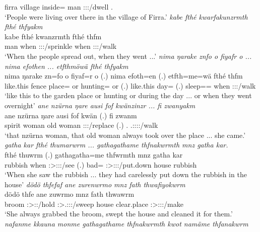 \begin{exe}
	firra village inside={\Loc} man \Stpl:\Sbj:\Pst:\Dur/dwell \Dist.{\All}\\
	\trans `People were living over there in the village of Firra.'
	\emph{kabe fthé kwarfakunzrmth fthé thfyakm}\\
	\gll kabe fthé kwanzrmth fthé thfm\\
	man when \Stpl:\Sbj:\Pst:\Dur/sprinkle when \Stpl:\Sbj:\Pst:\Dur/walk\\
	\trans `When the people spread out, when they went ...'
	\emph{nima ŋarake znfo o fiyafr o ... nima efothen ... etfthmöwä fthé thfyakm}\\
	\gll nima ŋarake zn=fo o fiyaf=r o (.) nima efoth=en (.) etfth=me=wä fthé thfm\\
	{like.this} fence place={\Loc} or hunting={\Purp} or (.) {like.this} day={\Loc} (.) sleep=\Ins={\Emph} when \Stpl:\Sbj:\Pst:\Dur/walk\\
	\trans `like this to the garden place or hunting or during the day ... or when they went overnight'
	\emph{ane nzürna ŋare ausi fof kwänzinzr ... fi zwanyakm}\\
	\gll ane nzürna ŋare ausi fof kwän (.) fi zwanm\\
	{\Dem} spirit woman {old woman} {\Emph} \Stsg:\Sbj:\Iter:\Venit/replace (.) \Third.{\Abs} \Tsg.\F:\Sbj:\Pst:\Dur:\Venit/walk\\
	\trans `that nzürna woman, that old woman always took over the place ... she came.'
	\emph{gatha kar fthé thumarwrm ... gathagathame thfnakwrmth mnz gatha kar.}\\
	 fthé thuwrm (.) {gathagatha}=me thfwrmth mnz {gatha kar}\\
	rubbish when \Stsg:\Sbj>\Stpl:\Obj:\Pst:\Dur/see (.) bad={\Ins} \Stpl:\Sbj>\Stpl:\Obj:\Pst:\Dur/put.down house rubbish\\
	\trans `When she saw the rubbish ... they had carelessly put down the rubbish in the house'
	\emph{dödö thfefaf ane zurenwrmo mnz fath thwafiyokwrm}\\
	\gll dödö thfe ane zuwrmo mnz fath thwawrm\\
	broom \Stsg:\Sbj>\Stpl:\Obj:\Iter/hold {\Dem} \Sg:\Sbj>\Tsg.\F:\Pst:\Dur:\Andat/sweep house clear.place \Sg:\Sbj>\Stpl:\Io:\Pst:\Dur/make\\
	\trans `She always grabbed the broom, swept the house and cleaned it for them.'
	\emph{nafanme kkauna monme gathagathame thfnakwrmth kwot namäme thfanakwrm}\\

\end{exe}
